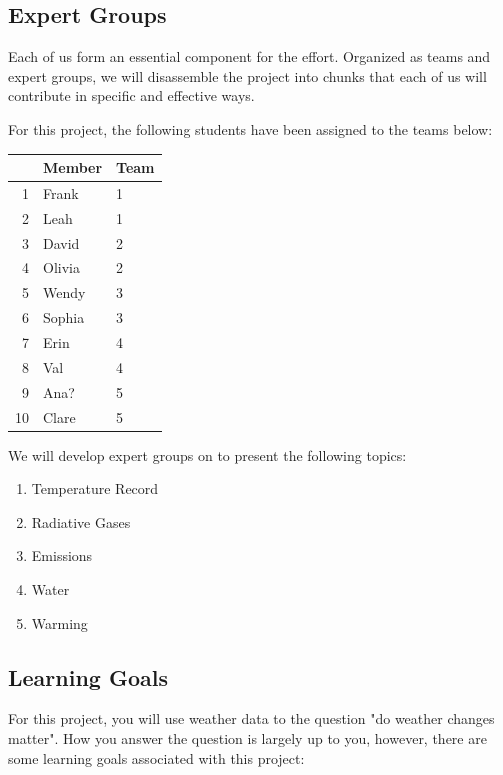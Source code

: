 \documentclass{article}\usepackage[]{graphicx}\usepackage[]{color}
\begin{document}
\subsection{Expert Groups}

Each of us form an essential component for the effort. Organized as teams and expert groups, we will disassemble the project into chunks that each of us will contribute in specific and effective ways.

For this project, the following students have been assigned to the teams below:

\begin{table}[ht]
\centering
\begin{tabular}{rll}
  \hline
 & Member & Team \\ 
  \hline
1 & Frank & 1 \\ 
  2 & Leah & 1 \\ 
  3 & David & 2 \\ 
  4 & Olivia & 2 \\ 
  5 & Wendy & 3 \\ 
  6 & Sophia & 3 \\ 
  7 & Erin & 4 \\ 
  8 & Val & 4 \\ 
  9 & Ana? & 5 \\ 
  10 & Clare & 5 \\ 
   \hline
\end{tabular}
\end{table}


We will develop expert groups on to present the following topics:

\begin{enumerate}
  \item Temperature Record
  \item Radiative Gases
  \item Emissions 
  \item Water
  \item Warming 
\end{enumerate}


\subsection{Learning Goals}

For this project, you will use weather data to the question "do weather changes matter". How you answer the question is largely up to you, however, there are some learning goals associated with this project:
\end{document}
